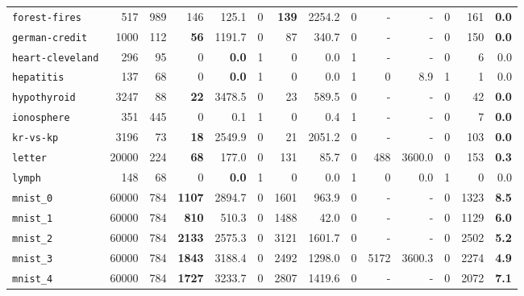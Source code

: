 \begin{tabular}{lccrrrrrrrrrrr}
\texttt{forest-fires} & \multicolumn{1}{r}{517} & \multicolumn{1}{r}{989}  & 146 & 125.1 & 0 & \textbf{139} & 2254.2 & 0 & - & - & 0 & 161 & \textbf{0.0}\\
\texttt{german-credit} & \multicolumn{1}{r}{1000} & \multicolumn{1}{r}{112}  & \textbf{56} & 1191.7 & 0 & 87 & 340.7 & 0 & - & - & 0 & 150 & \textbf{0.0}\\
\texttt{heart-cleveland} & \multicolumn{1}{r}{296} & \multicolumn{1}{r}{95}  & 0 & \textbf{0.0} & 1 & 0 & 0.0 & 1 & - & - & 0 & 6 & 0.0\\
\texttt{hepatitis} & \multicolumn{1}{r}{137} & \multicolumn{1}{r}{68}  & 0 & \textbf{0.0} & 1 & 0 & 0.0 & 1 & 0 & 8.9 & 1 & 1 & 0.0\\
\texttt{hypothyroid} & \multicolumn{1}{r}{3247} & \multicolumn{1}{r}{88}  & \textbf{22} & 3478.5 & 0 & 23 & 589.5 & 0 & - & - & 0 & 42 & \textbf{0.0}\\
\texttt{ionosphere} & \multicolumn{1}{r}{351} & \multicolumn{1}{r}{445}  & 0 & 0.1 & 1 & 0 & 0.4 & 1 & - & - & 0 & 7 & \textbf{0.0}\\
\texttt{kr-vs-kp} & \multicolumn{1}{r}{3196} & \multicolumn{1}{r}{73}  & \textbf{18} & 2549.9 & 0 & 21 & 2051.2 & 0 & - & - & 0 & 103 & \textbf{0.0}\\
\texttt{letter} & \multicolumn{1}{r}{20000} & \multicolumn{1}{r}{224}  & \textbf{68} & 177.0 & 0 & 131 & 85.7 & 0 & 488 & 3600.0 & 0 & 153 & \textbf{0.3}\\
\texttt{lymph} & \multicolumn{1}{r}{148} & \multicolumn{1}{r}{68}  & 0 & \textbf{0.0} & 1 & 0 & 0.0 & 1 & 0 & 0.0 & 1 & 0 & 0.0\\
\texttt{mnist\_0} & \multicolumn{1}{r}{60000} & \multicolumn{1}{r}{784}  & \textbf{1107} & 2894.7 & 0 & 1601 & 963.9 & 0 & - & - & 0 & 1323 & \textbf{8.5}\\
\texttt{mnist\_1} & \multicolumn{1}{r}{60000} & \multicolumn{1}{r}{784}  & \textbf{810} & 510.3 & 0 & 1488 & 42.0 & 0 & - & - & 0 & 1129 & \textbf{6.0}\\
\texttt{mnist\_2} & \multicolumn{1}{r}{60000} & \multicolumn{1}{r}{784}  & \textbf{2133} & 2575.3 & 0 & 3121 & 1601.7 & 0 & - & - & 0 & 2502 & \textbf{5.2}\\
\texttt{mnist\_3} & \multicolumn{1}{r}{60000} & \multicolumn{1}{r}{784}  & \textbf{1843} & 3188.4 & 0 & 2492 & 1298.0 & 0 & 5172 & 3600.3 & 0 & 2274 & \textbf{4.9}\\
\texttt{mnist\_4} & \multicolumn{1}{r}{60000} & \multicolumn{1}{r}{784}  & \textbf{1727} & 3233.7 & 0 & 2807 & 1419.6 & 0 & - & - & 0 & 2072 & \textbf{7.1}\\

\end{tabular}
